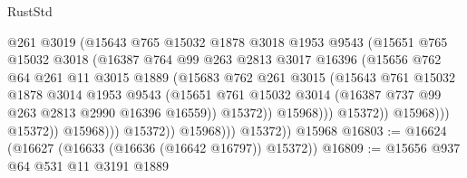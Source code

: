 \begin{lexlean}{RustStd}
\begin{coremodule}
                                    @261
                                    @3019
                                    (@15643
                                      @765
                                      @15032
                                      @1878
                                      @3018
                                      @1953
                                      @9543
                                      (@15651
                                        @765
                                        @15032
                                        @3018
                                        (@16387
                                          @764
                                          @99
                                          @263
                                          @2813
                                          @3017
                                          @16396
                                          (@15656
                                            @762
                                            @64
                                            @261
                                            @11
                                            @3015
                                            @1889
                                            (@15683
                                              @762
                                              @261
                                              @3015
                                              (@15643
                                                @761
                                                @15032
                                                @1878
                                                @3014
                                                @1953
                                                @9543
                                                (@15651
                                                  @761
                                                  @15032
                                                  @3014
                                                  (@16387 @737 @99 @263 @2813 @2990 @16396 @16559))
                                                @15372))
                                            @15968)))
                                      @15372))
                                  @15968)))
                            @15372))
                        @15968)))
                  @15372))
              @15968)))
        @15372))
    @15968
@16803 := @16624 (@16627 (@16633 (@16636 (@16642 @16797)) @15372))
@16809 := @15656 @937 @64 @531 @11 @3191 @1889

\end{coremodule}
\end{lexlean}
